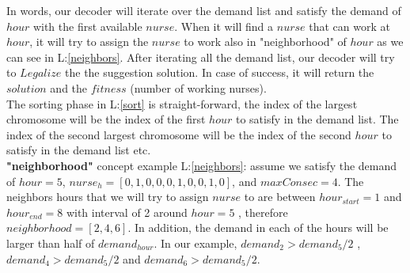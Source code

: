 \documentclass{article}
\newcommand\tab[1][1cm]{\hspace*{#1}}
\begin{document}
\tab In words, our decoder will iterate over the demand list and satisfy the demand of $hour$ with the first available $nurse$. When it will find a $nurse$ that can work at $hour$, it will try to assign the $nurse$ to work also in "neighborhood" of $hour$ as we can see in L:\ref{neighbors}. After iterating all the demand list, our decoder will try to $Legalize$ the the suggestion solution. In case of success, it will return the $solution$ and the $fitness$ (number of working nurses).
\\\tab The sorting phase in L:\ref{sort} is straight-forward, the index of the largest chromosome will be the index of the first $hour$ to satisfy in the demand list. The index of the second largest chromosome will be the index of the second $hour$ to satisfy in the demand list etc.
\\\tab \textbf{"neighborhood"} concept example L:\ref{neighbors}: assume we satisfy the demand of $hour=5$, $nurse_h = [0,1,0,0,0,1,0,0,1,0]$, and $maxConsec=4$. The neighbors hours that we will try to assign $nurse$ to are between $hour_{start} = 1$ and $hour_{end} = 8$ with interval of 2 around $hour=5$ , therefore $neighborhood = [2,4,6]$. In addition, the demand in each of the hours will be larger than half of $demand_{hour}$. In our example, $demand_2 >demand_5/2$ , $demand_4 >demand_5/2$ and $demand_6 >demand_5/2$.
\newpage
\end{document}
